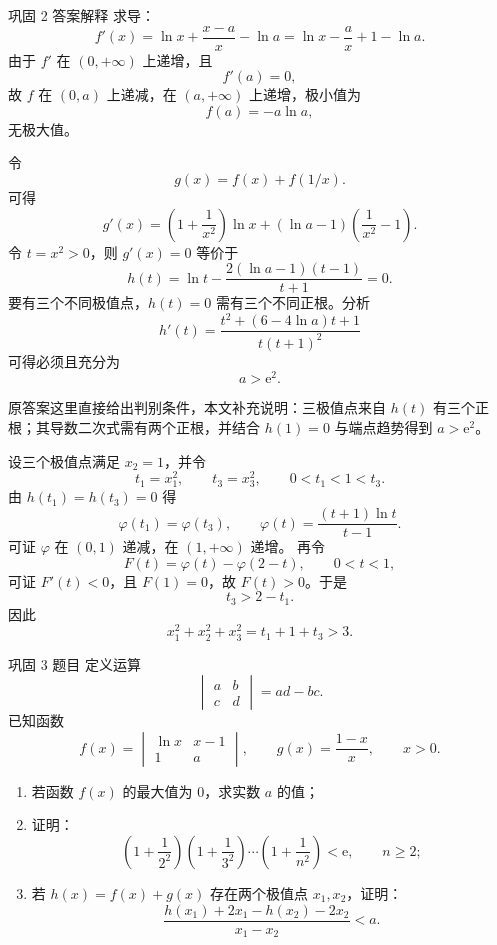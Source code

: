 ﻿\documentclass[aspectratio=169,10pt]{ctexbeamer}
\newcommand{\e}{\mathrm e}
\newcommand{\auditnote}[1]{\par\medskip{\color{Warn}\bfseries 原答案疏漏/补充：}#1}
\begin{document}
\begin{frame}[allowframebreaks]{巩固 2 答案解释}
\small
求导：
\[
f'(x)=\ln x+\frac{x-a}{x}-\ln a
=\ln x-\frac ax+1-\ln a.
\]
由于 $f'$ 在 $(0,+\infty)$ 上递增，且
\[
f'(a)=0,
\]
故 $f$ 在 $(0,a)$ 上递减，在 $(a,+\infty)$ 上递增，极小值为
\[
\boxed{f(a)=-a\ln a},
\]
无极大值。

\framebreak

令
\[
g(x)=f(x)+f(1/x).
\]
可得
\[
g'(x)=\left(1+\frac1{x^2}\right)\ln x+(\ln a-1)\left(\frac1{x^2}-1\right).
\]
令 $t=x^2>0$，则 $g'(x)=0$ 等价于
\[
h(t)=\ln t-\frac{2(\ln a-1)(t-1)}{t+1}=0.
\]
要有三个不同极值点，$h(t)=0$ 需有三个不同正根。分析
\[
h'(t)=\frac{t^2+(6-4\ln a)t+1}{t(t+1)^2}
\]
可得必须且充分为
\[
\boxed{a>\e^2}.
\]
\auditnote{原答案这里直接给出判别条件，本文补充说明：三极值点来自 $h(t)$ 有三个正根；其导数二次式需有两个正根，并结合 $h(1)=0$ 与端点趋势得到 $a>\e^2$。}

\framebreak

设三个极值点满足 $x_2=1$，并令
\[
t_1=x_1^2,\qquad t_3=x_3^2,\qquad 0<t_1<1<t_3.
\]
由 $h(t_1)=h(t_3)=0$ 得
\[
\varphi(t_1)=\varphi(t_3),\qquad
\varphi(t)=\frac{(t+1)\ln t}{t-1}.
\]
可证 $\varphi$ 在 $(0,1)$ 递减，在 $(1,+\infty)$ 递增。
再令
\[
F(t)=\varphi(t)-\varphi(2-t),\qquad 0<t<1,
\]
可证 $F'(t)<0$，且 $F(1)=0$，故 $F(t)>0$。于是
\[
t_3>2-t_1.
\]
因此
\[
x_1^2+x_2^2+x_3^2=t_1+1+t_3>3.
\]
\end{frame}

\begin{frame}{巩固 3 题目}
\small
定义运算
\[
\begin{vmatrix}a&b\\c&d\end{vmatrix}=ad-bc.
\]
已知函数
\[
f(x)=
\begin{vmatrix}
\ln x&x-1\\
1&a
\end{vmatrix},
\qquad
g(x)=\frac{1-x}{x},\qquad x>0.
\]
\begin{enumerate}
  \item 若函数 $f(x)$ 的最大值为 $0$，求实数 $a$ 的值；
  \item 证明：
  \[
  \left(1+\frac1{2^2}\right)\left(1+\frac1{3^2}\right)\cdots
  \left(1+\frac1{n^2}\right)<\e,\qquad n\ge2;
  \]
  \item 若 $h(x)=f(x)+g(x)$ 存在两个极值点 $x_1,x_2$，证明：
  \[
  \frac{h(x_1)+2x_1-h(x_2)-2x_2}{x_1-x_2}<a.
  \]
\end{enumerate}
\end{frame}
\end{document}
